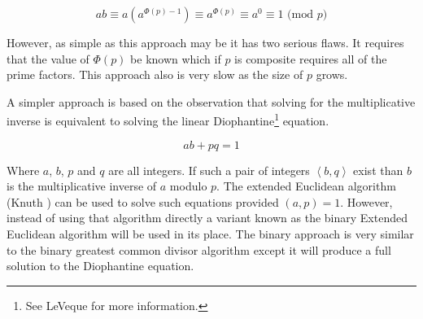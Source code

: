 \documentclass[b5paper]{book}
\begin{document}
\begin{equation}
ab \equiv a \left (a^{\Phi(p) - 1} \right ) \equiv a^{\Phi(p)} \equiv a^0 \equiv 1 \mbox{ (mod }p\mbox{)}
\end{equation}

However, as simple as this approach may be it has two serious flaws.  It requires that the value of $\Phi(p)$ be known which if $p$ is composite 
requires all of the prime factors.  This approach also is very slow as the size of $p$ grows.  

A simpler approach is based on the observation that solving for the multiplicative inverse is equivalent to solving the linear 
Diophantine\footnote{See LeVeque \cite[pp. 40-43]{LeVeque} for more information.} equation.

\begin{equation}
ab + pq = 1
\end{equation}

Where $a$, $b$, $p$ and $q$ are all integers.  If such a pair of integers $ \left < b, q \right >$ exist than $b$ is the multiplicative inverse of 
$a$ modulo $p$.  The extended Euclidean algorithm (Knuth \cite[pp. 342]{TAOCPV2}) can be used to solve such equations provided $(a, p) = 1$.  
However, instead of using that algorithm directly a variant known as the binary Extended Euclidean algorithm will be used in its place.  The
binary approach is very similar to the binary greatest common divisor algorithm except it will produce a full solution to the Diophantine 
equation.  
\end{document}

